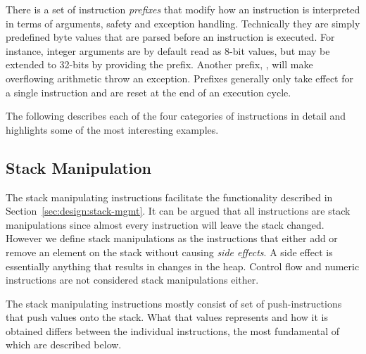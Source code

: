 There is a set of instruction \emph{prefixes} that modify how an instruction is
interpreted in terms of arguments, safety and exception handling. Technically
they are simply predefined byte values that are parsed before an instruction is
executed. For instance, integer arguments are by default read as 8-bit values,
but may be extended to 32-bits by providing the  prefix. Another
prefix, , will make overflowing arithmetic throw an
exception. Prefixes generally only take effect for a single instruction and are
reset at the end of an execution cycle.

The following describes each of the four categories of instructions in detail
and highlights some of the most interesting examples.

\subsection{Stack Manipulation}

The stack manipulating instructions facilitate the functionality described in
Section~\ref{sec:design:stack-mgmt}. It can be argued that all instructions are
stack manipulations since almost every instruction will leave the stack
changed. However we define stack manipulations as the instructions that either
add or remove an element on the stack without causing \textit{side effects}. A
side effect is essentially anything that results in changes in the heap. Control
flow and numeric instructions are not considered stack manipulations either.

The stack manipulating instructions mostly consist of set of push-instructions
that push values onto the stack. What that values represents and how it is
obtained differs between the individual instructions, the most fundamental of
which are described below.

